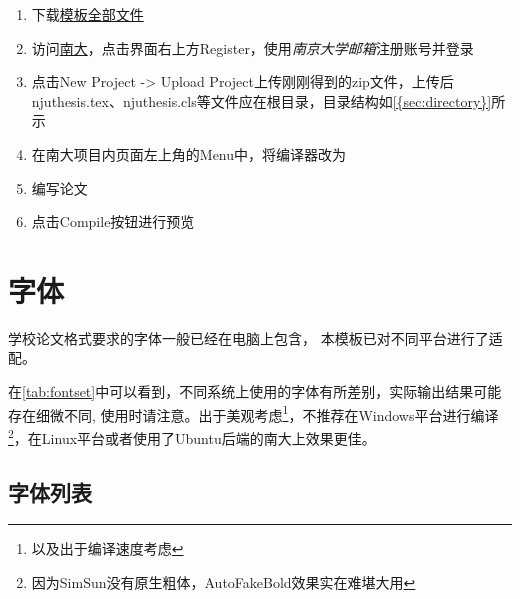 \begin{enumerate}
    \item 下载\href{https://github.com/nju-lug/NJUThesisUndergraduate/archive/refs/heads/master.zip}{模板全部文件}
    \item 访问\href{https://tex.nju.edu.cn}{南大}，点击界面右上方Register，使用\emph{南京大学邮箱}注册账号并登录
    \item 点击New Project -> Upload Project上传刚刚得到的zip文件，上传后njuthesis.tex、njuthesis.cls等文件应在根目录，目录结构如\cref{{sec:directory}}所示
    \item 在南大项目内页面左上角的Menu中，将编译器改为
    \item 编写论文
    \item 点击Compile按钮进行预览
\end{enumerate}

\section{字体}

学校论文格式要求的字体一般已经在电脑上包含，
本模板已对不同平台进行了适配。

在\cref{tab:fontset}中可以看到，不同系统上使用的字体有所差别，实际输出结果可能存在细微不同, 使用时请注意。出于美观考虑\footnote{以及出于编译速度考虑}，不推荐在Windows平台进行编译\footnote{因为SimSun没有原生粗体，AutoFakeBold效果实在难堪大用}，在Linux平台或者使用了Ubuntu后端的南大上效果更佳。

    
       



\subsection{字体列表}

